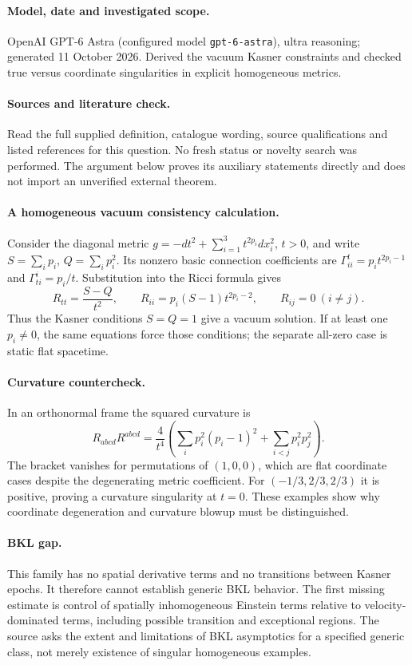 \documentclass[11pt]{article}
\begin{document}
\paragraph{Model, date and investigated scope.}
OpenAI GPT-6 Astra (configured model \texttt{gpt-6-astra}), ultra reasoning; generated 11 October 2026. Derived the vacuum Kasner constraints and checked true versus coordinate singularities in explicit homogeneous metrics.

\paragraph{Sources and literature check.}
Read the full supplied definition, catalogue wording, source qualifications and listed references for this question. No fresh status or novelty search was performed. The argument below proves its auxiliary statements directly and does not import an unverified external theorem.

\paragraph{A homogeneous vacuum consistency calculation.} Consider the diagonal metric \(g=-dt^2+\sum_{i=1}^3t^{2p_i}dx_i^2\), \(t>0\), and write \(S=\sum_i p_i\), \(Q=\sum_i p_i^2\). Its nonzero basic connection coefficients are \(\Gamma^t_{ii}=p_it^{2p_i-1}\) and \(\Gamma^i_{ti}=p_i/t\). Substitution into the Ricci formula gives
\[
 R_{tt}=\frac{S-Q}{t^2},\qquad
 R_{ii}=p_i(S-1)t^{2p_i-2},\qquad R_{ij}=0\ (i\ne j).
\]
Thus the Kasner conditions \(S=Q=1\) give a vacuum solution. If at least one \(p_i\ne0\), the same equations force those conditions; the separate all-zero case is static flat spacetime.
\paragraph{Curvature countercheck.} In an orthonormal frame the squared curvature is
\[
 R_{abcd}R^{abcd}=\frac4{t^4}\left(\sum_i p_i^2(p_i-1)^2+\sum_{i<j}p_i^2p_j^2\right).
\]
The bracket vanishes for permutations of \((1,0,0)\), which are flat coordinate cases despite the degenerating metric coefficient. For \((-1/3,2/3,2/3)\) it is positive, proving a curvature singularity at \(t=0\). These examples show why coordinate degeneration and curvature blowup must be distinguished.
\paragraph{BKL gap.} This family has no spatial derivative terms and no transitions between Kasner epochs. It therefore cannot establish generic BKL behavior. The first missing estimate is control of spatially inhomogeneous Einstein terms relative to velocity-dominated terms, including possible transition and exceptional regions. The source asks the extent and limitations of BKL asymptotics for a specified generic class, not merely existence of singular homogeneous examples.
\end{document}
